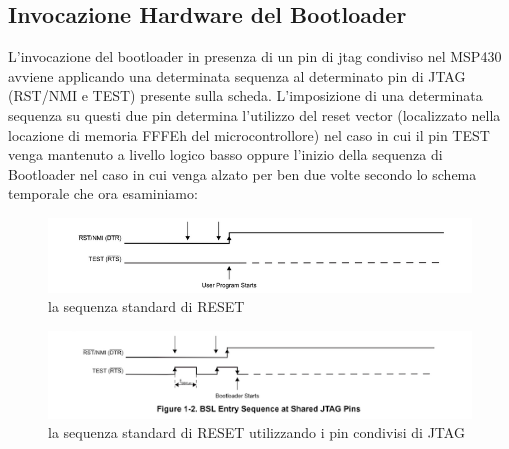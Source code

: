 \documentclass[LaM,binding=0.6cm]{../sapthesis}
\begin{document}
\subsection{Invocazione Hardware del Bootloader}

L’invocazione del bootloader in presenza di un pin di jtag condiviso nel MSP430 avviene applicando una determinata sequenza al determinato pin di JTAG (RST/NMI e TEST) presente sulla scheda.
L’imposizione di una determinata sequenza su questi due pin determina l’utilizzo del reset vector (localizzato nella locazione di memoria FFFEh del microcontrollore) nel caso in cui il pin TEST venga mantenuto a livello logico basso oppure l’inizio della sequenza di Bootloader nel caso in cui venga alzato per ben due volte secondo lo schema temporale che ora esaminiamo:

\begin{figure}[htbp]
\centerline{\includegraphics[scale=.7]{examples/resetSequence.PNG}}
\caption{la sequenza standard di RESET}
\label{fig}
\end{figure}

\begin{figure}[htbp]
\centerline{\includegraphics[scale=1.15]{examples/BSLEntrySequence.png}}
\caption{la sequenza standard di RESET utilizzando i pin condivisi di JTAG}
\label{fig}
\end{figure}
\end{document}
